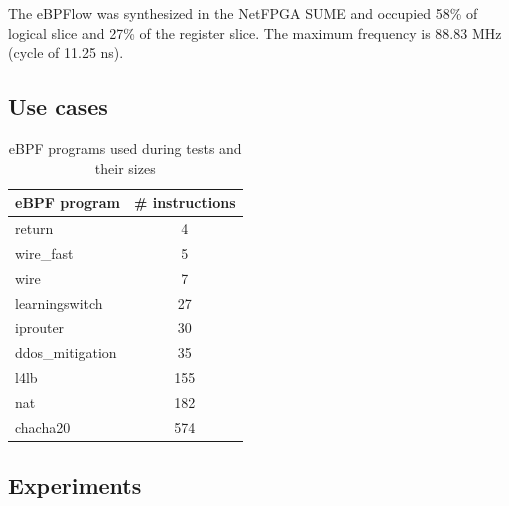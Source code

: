 
The eBPFlow was synthesized in the NetFPGA SUME and occupied 58\% of logical slice and 27\% of the register slice. The maximum frequency is 88.83 MHz (cycle of 11.25 ns).


\subsection{Use cases}

\begin{table}[h]
\centering
\caption{eBPF programs used during tests and their sizes}
\label{tbl:example-sizes}
\begin{tabular}{|l|c|}
\hline
\textbf{eBPF program} & \textbf{\# instructions} \\ \hline
return                & 4                        \\ \hline
wire\_fast            & 5                        \\ \hline
wire                  & 7                        \\ \hline
learningswitch        & 27                       \\ \hline
iprouter              & 30                       \\ \hline
ddos\_mitigation      & 35                       \\ \hline
l4lb                  & 155                      \\ \hline
nat                   & 182                      \\ \hline
chacha20              & 574                      \\ \hline
\end{tabular}
\end{table}

\subsection{Experiments} 
\label{sec:experiments}


